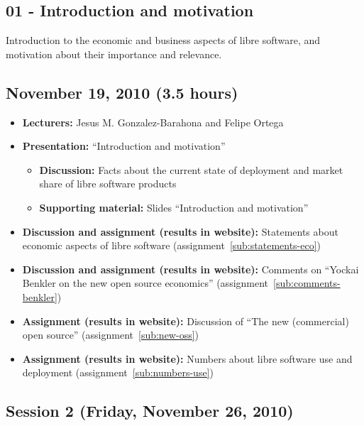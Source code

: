 \documentclass[a4paper]{article}
\begin{document}
\subsection{01 - Introduction and motivation}

Introduction to the economic and business aspects of libre software, and motivation about their importance and relevance.

\subsection{November 19, 2010 (3.5 hours)}

\begin{itemize}
\item \textbf{Lecturers:} Jesus M. Gonzalez-Barahona and Felipe Ortega
\item \textbf{Presentation:} ``Introduction and motivation''
  \begin{itemize}
  \item \textbf{Discussion:} Facts about the current state of deployment and market share of libre software products
  \item \textbf{Supporting material:} Slides ``Introduction and motivation''
  \end{itemize}
\item \textbf{Discussion and assignment (results in website):} Statements about economic aspects of libre software (assignment~\ref{sub:statements-eco})
\item \textbf{Discussion and assignment (results in website):} Comments on ``Yockai Benkler on the new open source economics'' (assignment~\ref{sub:comments-benkler})
\item \textbf{Assignment (results in website):} Discussion of ``The new (commercial) open source'' (assignment~\ref{sub:new-oss})
\item \textbf{Assignment (results in website):} Numbers about libre software use and deployment (assignment~\ref{sub:numbers-use})
\end{itemize}


\subsection{Session 2 (Friday, November 26, 2010)}
\end{document}
